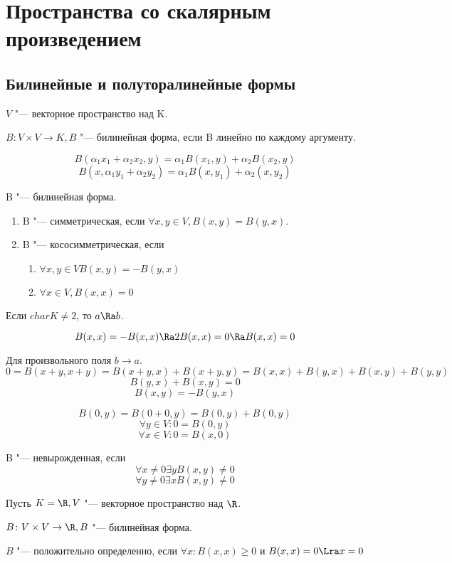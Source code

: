 ﻿\chapter{Пространства со скалярным произведением}
\section{Билинейные и полуторалинейные формы}
\begin{Def}
$V$ "--- векторное пространство над K. 

$B \colon V \times V \to K, B$ "--- билинейная форма, 
если B линейно по каждому аргументу.

$$B(\alpha_1 x_1 + \alpha_2 x_2, y) = \alpha_1 B(x_1, y) + \alpha_2 B(x_2, y)$$
$$B(x, \alpha_1y_1 + \alpha_2 y_2) = \alpha_1 B(x, y_1) + \alpha_2(x, y_2)$$
\end{Def}
\begin{Def}
B "--- билинейная форма.
    \begin{enumerate}
    \item B "--- симметрическая, если $\forall x, y \in V, B(x, y) = B(y, x)$.
    \item B "--- кососимметрическая, если 
        \begin{enumerate}
        \item $\forall x, y \in V B(x, y) = -B(y, x)$
        \item $\forall x \in V, B(x, x) = 0$
        \end{enumerate}
    \end{enumerate}
\end{Def}
\begin{Rem}
Если $char K \ne 2$, то  $a \Ra b$.

$$B(x, x) = -B(x, x) \Ra 2B(x, x) = 0 \Ra B(x, x) = 0$$
\end{Rem}
\begin{Rem}
Для произвольного поля $b \to a$.
$$0 = B(x + y, x + y) = B(x + y, x) + B(x + y, y) = B(x, x) + B(y, x) + B(x, y) + B(y, y)$$
$$B(y, x) + B(x, y) = 0$$
$$B(x, y) = -B(y, x)$$
\end{Rem}

$$B(0, y) = B(0 + 0, y) = B(0, y) + B(0, y)$$
$$\forall y \in V \colon 0 = B(0, y)$$
$$\forall x \in V \colon 0 = B(x, 0)$$

\begin{Def}
B "--- невырожденная, если 
$$\forall x \ne 0 \exists y B(x, y) \ne 0$$
$$\forall y \ne 0 \exists x B(x, y) \ne 0$$
\end{Def}
\begin{Def}
Пусть $K = \R, V$ "--- векторное пространство над $\R$.

$B \colon V \times V \to \R, B$ "--- билинейная форма.

$B$ "--- положительно определенно, если 
$\forall x\colon B(x, x) \ge 0$ и $B(x, x) = 0 \Lra x = 0$
\end{Def}

